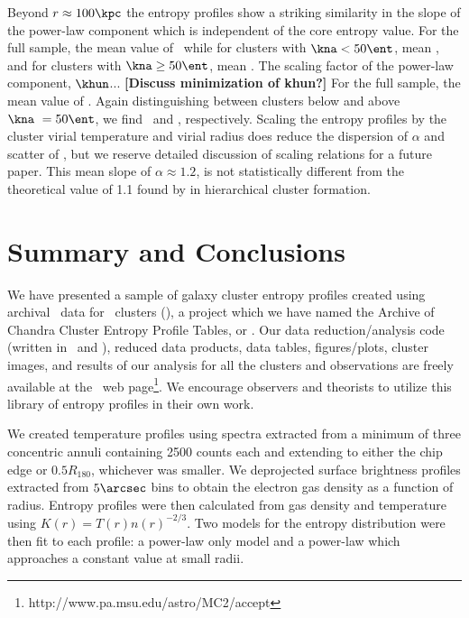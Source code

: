\documentclass{emulateapj}
\begin{document}
Beyond $r \approx 100 \kpc$ the entropy profiles show a striking
similarity in the slope of the power-law component which is
independent of the core entropy value. For the full sample, the mean
value of \alphafs\ while for clusters with $\kna < 50 \ent$, mean
\alphaga, and for clusters with $\kna \geq 50 \ent$, mean
\alphagb. The scaling factor of the power-law component,
$\khun$... {\bf{[Discuss minimization of khun?]}}  For the full
sample, the mean value of \khunfs. Again distinguishing between
clusters below and above $\kna\ = 50 \ent$, we find \khunga\ and
\khungb, respectively. Scaling the entropy profiles by the cluster
virial temperature and virial radius does reduce the dispersion of
$\alpha$ and scatter of \khun, but we reserve detailed discussion of
scaling relations for a future paper. This mean slope of $\alpha
\approx 1.2$, is not statistically different from the theoretical
value of 1.1 found by \cite{tozzi01} in hierarchical cluster
formation.

\section{Summary and Conclusions}
\label{sec:summary}

We have presented a sample of galaxy cluster entropy profiles created
using archival \chandra\ data for \numcluster\ clusters (\expt), a
project which we have named the Archive of Chandra Cluster Entropy
Profile Tables, or \accept. Our data reduction/analysis code (written
in \perl\ and \idl), reduced data products, data tables,
figures/plots, cluster images, and results of our analysis for all the
clusters and observations are freely available at the \accept\ web
page\footnote{http://www.pa.msu.edu/astro/MC2/accept}. We encourage
observers and theorists to utilize this library of entropy profiles in
their own work.

We created temperature profiles using spectra extracted from a minimum
of three concentric annuli containing 2500 counts each and extending
to either the chip edge or $0.5 R_{180}$, whichever was smaller. We
deprojected surface brightness profiles extracted from $5\arcsec$ bins
to obtain the electron gas density as a function of radius. Entropy
profiles were then calculated from gas density and temperature using
$K(r) = T(r)n(r)^{-2/3}$. Two models for the entropy distribution were
then fit to each profile: a power-law only model and a power-law which
approaches a constant value at small radii.
\end{document}
